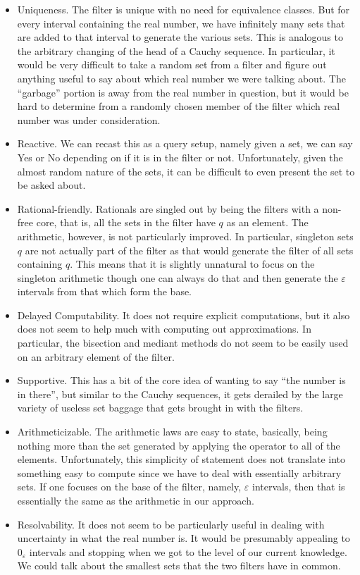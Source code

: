 \documentclass[12pt]{article}
\theoremstyle{remark}
\begin{document}
\begin{itemize}
    \item Uniqueness. The filter is unique with no need for equivalence classes. But for every interval containing the real number, we have infinitely many sets that are added to that interval to generate the various sets. This is analogous to the arbitrary changing of the head of a Cauchy sequence. In particular, it would be very difficult to take a random set from a filter and figure out anything useful to say about which real number we were talking about. The ``garbage'' portion is away from the real number in question, but it would be hard to determine from a randomly chosen member of the filter which real number was under consideration. 
    \item Reactive. We can recast this as a query setup, namely given a set, we can say Yes or No depending on if it is in the filter or not. Unfortunately, given the almost random nature of the sets, it can be difficult to even present the set to be asked about. 
    \item Rational-friendly. Rationals are singled out by being the filters with a non-free core, that is, all the sets in the filter have $q$ as an element. The arithmetic, however, is not particularly improved. In particular, singleton sets $q$ are not actually part of the filter as that would generate the filter of all sets containing $q$. This means that it is slightly unnatural to focus on the singleton arithmetic though one can always do that and then generate the $\varepsilon$ intervals from that which form the base. 
    \item Delayed Computability. It does not require explicit computations, but it also does not seem to help much with computing out approximations. In particular, the bisection and mediant methods do not seem to be easily used on an arbitrary element of the filter. 
    \item Supportive. This has a bit of the core idea of wanting to say ``the number is in there'', but similar to the Cauchy sequences, it gets derailed by the large variety of useless set baggage that gets brought in with the filters. 
    \item Arithmeticizable. The arithmetic laws are easy to state, basically, being nothing more than the set generated by applying the operator to all of the elements. Unfortunately, this simplicity of statement does not translate into something easy to compute since we have to deal with essentially arbitrary sets. If one focuses on the base of the filter, namely, $\varepsilon$ intervals, then that is essentially the same as the arithmetic in our approach. 
    \item Resolvability. It does not seem to be particularly useful in dealing with uncertainty in what the real number is. It would be presumably appealing to $0_{\varepsilon}$ intervals and stopping when we got to the level of our current knowledge. We could talk about the smallest sets that the two filters have in common. 
\end{itemize}
\end{document}
